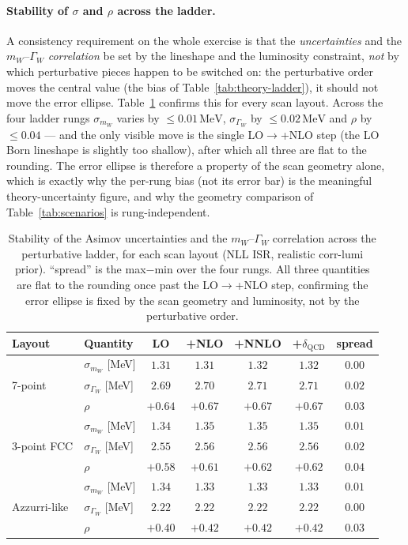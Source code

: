 \documentclass[11pt,a4paper]{article}
\newcommand{\mW}{m_W}
\newcommand{\GammaW}{\Gamma_W}
\newcommand{\MeV}{\ensuremath{\,\mathrm{MeV}}}
\begin{document}
\paragraph{Stability of $\sigma$ and $\rho$ across the ladder.}
A consistency requirement on the whole exercise is that the
\emph{uncertainties} and the $\mW$--$\GammaW$ \emph{correlation} be set by the
lineshape and the luminosity constraint, \emph{not} by which perturbative
pieces happen to be switched on: the perturbative order moves the central
value (the bias of Table~\ref{tab:theory-ladder}), it should not move the
error ellipse. Table~\ref{tab:scenario-stability} confirms this for every
scan layout. Across the four ladder rungs $\sigma_{\mW}$ varies by
$\le\!0.01\MeV$, $\sigma_{\GammaW}$ by $\le\!0.02\MeV$ and $\rho$ by
$\le\!0.04$ --- and the only visible move is the single LO$\to$+NLO step
(the LO Born lineshape is slightly too shallow), after which all three are
flat to the rounding. The error ellipse is therefore a property of the scan
geometry alone, which is exactly why the per-rung bias (not its error bar) is
the meaningful theory-uncertainty figure, and why the geometry comparison of
Table~\ref{tab:scenarios} is rung-independent.

\begin{table}[h]
\centering
\caption{Stability of the Asimov uncertainties and the $\mW$--$\GammaW$
correlation across the perturbative ladder, for each scan layout (NLL ISR,
realistic corr-lumi prior). ``spread'' is the max$-$min over the four rungs.
All three quantities are flat to the rounding once past the LO$\to$+NLO step,
confirming the error ellipse is fixed by the scan geometry and luminosity,
not by the perturbative order.}
\label{tab:scenario-stability}
\begin{tabular}{l l c c c c c}
\toprule
Layout & Quantity & LO & +NLO & +NNLO & +$\delta_\text{QCD}$ & spread \\
\midrule
\multirow{3}{*}{7-point}
 & $\sigma_{\mW}$ [MeV]     & $1.31$ & $1.31$ & $1.32$ & $1.32$ & $0.00$ \\
 & $\sigma_{\GammaW}$ [MeV] & $2.69$ & $2.70$ & $2.71$ & $2.71$ & $0.02$ \\
 & $\rho$                   & $+0.64$ & $+0.67$ & $+0.67$ & $+0.67$ & $0.03$ \\
\midrule
\multirow{3}{*}{3-point FCC}
 & $\sigma_{\mW}$ [MeV]     & $1.34$ & $1.35$ & $1.35$ & $1.35$ & $0.01$ \\
 & $\sigma_{\GammaW}$ [MeV] & $2.55$ & $2.56$ & $2.56$ & $2.56$ & $0.02$ \\
 & $\rho$                   & $+0.58$ & $+0.61$ & $+0.62$ & $+0.62$ & $0.04$ \\
\midrule
\multirow{3}{*}{Azzurri-like}
 & $\sigma_{\mW}$ [MeV]     & $1.34$ & $1.33$ & $1.33$ & $1.33$ & $0.01$ \\
 & $\sigma_{\GammaW}$ [MeV] & $2.22$ & $2.22$ & $2.22$ & $2.22$ & $0.00$ \\
 & $\rho$                   & $+0.40$ & $+0.42$ & $+0.42$ & $+0.42$ & $0.03$ \\
\bottomrule
\end{tabular}
\end{table}
\end{document}
